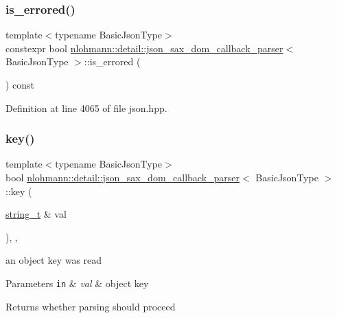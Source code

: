 \subsubsection{\texorpdfstring{is\+\_\+errored()}{is\_errored()}}
{\footnotesize\ttfamily template$<$typename Basic\+Json\+Type$>$ \\
constexpr bool \hyperlink{classnlohmann_1_1detail_1_1json__sax__dom__callback__parser}{nlohmann\+::detail\+::json\+\_\+sax\+\_\+dom\+\_\+callback\+\_\+parser}$<$ Basic\+Json\+Type $>$\+::is\+\_\+errored (\begin{DoxyParamCaption}{ }\end{DoxyParamCaption}) const\hspace{0.3cm}{\ttfamily [inline]}}



Definition at line 4065 of file json.\+hpp.

\mbox{\label{classnlohmann_1_1detail_1_1json__sax__dom__callback__parser_a5d268b49412ac97ab798d488c8e2cb12}} 
\subsubsection{\texorpdfstring{key()}{key()}}
{\footnotesize\ttfamily template$<$typename Basic\+Json\+Type$>$ \\
bool \hyperlink{classnlohmann_1_1detail_1_1json__sax__dom__callback__parser}{nlohmann\+::detail\+::json\+\_\+sax\+\_\+dom\+\_\+callback\+\_\+parser}$<$ Basic\+Json\+Type $>$\+::key (\begin{DoxyParamCaption}\item[{\hyperlink{structnlohmann_1_1json__sax_ae01977a9f3c5b3667b7a2929ed91061e}{string\+\_\+t} \&}]{val }\end{DoxyParamCaption})\hspace{0.3cm}{\ttfamily [inline]}, {\ttfamily [override]}, {\ttfamily [virtual]}}



an object key was read 


\begin{DoxyParams}[1]{Parameters}
\mbox{\tt in}  & {\em val} & object key \\
\hline
\end{DoxyParams}
\begin{DoxyReturn}{Returns}
whether parsing should proceed 
\end{DoxyReturn}


